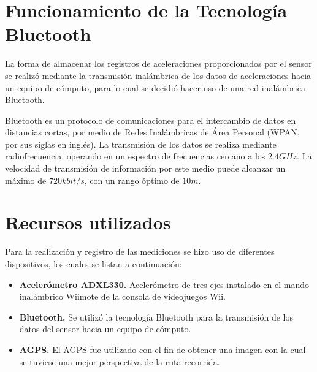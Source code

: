 \section{Funcionamiento de la Tecnología Bluetooth}

La forma de almacenar los registros de aceleraciones proporcionados por el sensor se realizó mediante la transmisión inalámbrica de los datos de aceleraciones hacia un equipo de cómputo, para lo cual se decidió hacer uso de una red inalámbrica Bluetooth.

Bluetooth es un protocolo de comunicaciones para el intercambio de datos en distancias cortas, por medio de Redes Inalámbricas de Área Personal (WPAN, por sus siglas en inglés). 
La transmisión de los datos se realiza mediante radiofrecuencia, operando en un espectro de frecuencias cercano a los $2.4GHz$. 
La velocidad de transmisión de información por este medio puede alcanzar un máximo de $720kbit/s$, con un rango óptimo de $10m$.

\section{Recursos utilizados}

Para la realización y registro de las mediciones se hizo uso de diferentes dispositivos, los cuales se listan a continuación:\\

\begin{itemize}
\item {\bf Acelerómetro ADXL330.} Acelerómetro de tres ejes instalado en el mando inalámbrico Wiimote de la consola de videojuegos Wii.
\item {\bf Bluetooth.} Se utilizó la tecnología Bluetooth para la transmisión de los datos del sensor hacia un equipo de cómputo.
\item {\bf AGPS.} El AGPS fue utilizado con el fin de obtener una imagen con la cual se tuviese una mejor perspectiva de la ruta recorrida.
\end{itemize}  

